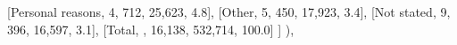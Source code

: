 \documentclass[
  11pt,
  a4paper,
]{article}
\newenvironment{Shaded}{\begin{snugshade}}{\end{snugshade}}
\newcommand{\NormalTok}[1]{\textcolor[rgb]{0.00,0.23,0.31}{#1}}
\newcommand{\StringTok}[1]{\textcolor[rgb]{0.13,0.47,0.30}{#1}}
\begin{document}
\begin{Shaded}
\begin{Highlighting}[]
\NormalTok{            [}\StringTok{\textquotesingle{}Personal reasons\textquotesingle{}}\NormalTok{, }\StringTok{\textquotesingle{}4\textquotesingle{}}\NormalTok{, }\StringTok{\textquotesingle{}712\textquotesingle{}}\NormalTok{, }\StringTok{\textquotesingle{}25,623\textquotesingle{}}\NormalTok{, }\StringTok{\textquotesingle{}4.8\textquotesingle{}}\NormalTok{],}
\NormalTok{            [}\StringTok{\textquotesingle{}Other\textquotesingle{}}\NormalTok{, }\StringTok{\textquotesingle{}5\textquotesingle{}}\NormalTok{, }\StringTok{\textquotesingle{}450\textquotesingle{}}\NormalTok{, }\StringTok{\textquotesingle{}17,923\textquotesingle{}}\NormalTok{, }\StringTok{\textquotesingle{}3.4\textquotesingle{}}\NormalTok{],}
\NormalTok{            [}\StringTok{\textquotesingle{}Not stated\textquotesingle{}}\NormalTok{, }\StringTok{\textquotesingle{}9\textquotesingle{}}\NormalTok{, }\StringTok{\textquotesingle{}396\textquotesingle{}}\NormalTok{, }\StringTok{\textquotesingle{}16,597\textquotesingle{}}\NormalTok{, }\StringTok{\textquotesingle{}3.1\textquotesingle{}}\NormalTok{],}
\NormalTok{            [}\StringTok{\textquotesingle{}Total\textquotesingle{}}\NormalTok{, }\StringTok{\textquotesingle{}\textquotesingle{}}\NormalTok{, }\StringTok{\textquotesingle{}16,138\textquotesingle{}}\NormalTok{, }\StringTok{\textquotesingle{}532,714\textquotesingle{}}\NormalTok{, }\StringTok{\textquotesingle{}100.0\textquotesingle{}}\NormalTok{]}
\NormalTok{        ]}
\NormalTok{    ),}


\end{Highlighting}
\end{Shaded}
\end{document}
